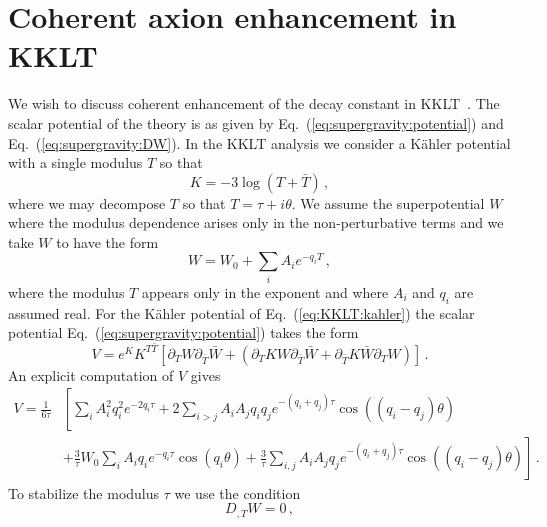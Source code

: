 \documentclass[12pt]{article}
\begin{document}

\section{Coherent axion enhancement in KKLT \label{sec:KKLT}}
We wish to discuss coherent enhancement of the decay constant in KKLT~\cite{Kachru:2003aw}.
The scalar potential of the theory is as given by Eq.~(\ref{eq:supergravity:potential}) and Eq.~(\ref{eq:supergravity:DW}).
In the KKLT analysis we consider a K\"ahler potential with a single modulus $T$ so that
\begin{equation} \label{eq:KKLT:kahler}
  K = -3 \log\left(T + \bar T\right)\,,
\end{equation}
where we may decompose $T$ so that $T = \tau + i \theta$.
We assume the superpotential $W$ where the modulus dependence arises only in the non-perturbative terms and we take $W$ to have the form
\begin{equation} \label{eq:KKLT:W}
  W = W_0 + \sum_i A_i e^{-q_i T}\,,
\end{equation}
where the modulus $T$ appears only in the exponent and where $A_i$ and $q_i$ are assumed real.
For the K\"ahler potential of Eq.~(\ref{eq:KKLT:kahler}) the scalar potential Eq.~(\ref{eq:supergravity:potential}) takes the form
\begin{equation}
  V = e^K K^{T \bar T} \left[
    \partial_T W \partial_{\bar T} \bar W +
    \left(\partial_T K W \partial_{\bar T} \bar W + \partial_{\bar T} K \bar W \partial_T W\right)
  \right]\,.
\end{equation}
An explicit computation of $V$ gives
\begin{equation} \label{eq:KKLT:VslowUnstabilized}
  \begin{aligned}
    V = \frac{1}{6 \tau} &\left[
        \sum_i A^2_i q^2_i e^{-2 q_i \tau}
      + 2 \sum_{i > j} A_i A_j q_i q_j e^{-\left(q_i + q_j\right)\tau}
        \cos\left(\left(q_i - q_j\right) \theta\right)\right.\\
    &{}\left. + \frac{3}{\tau} W_0 \sum_i A_i q_i e^{-q_i \tau} \cos\left(q_i \theta\right)
      + \frac{3}{\tau} \sum_{i, j} A_i A_j q_j e^{-\left(q_i + q_j\right) \tau}
        \cos\left(\left(q_i - q_j\right)\theta\right)
    \right]\,.
  \end{aligned}
\end{equation}
To stabilize the modulus $\tau$ we use the condition~\cite{Nath:1983aw}
\begin{equation} \label{eq:KKLT:stabilization}
  D_{,T} W = 0\,,
\end{equation}
\end{document}
